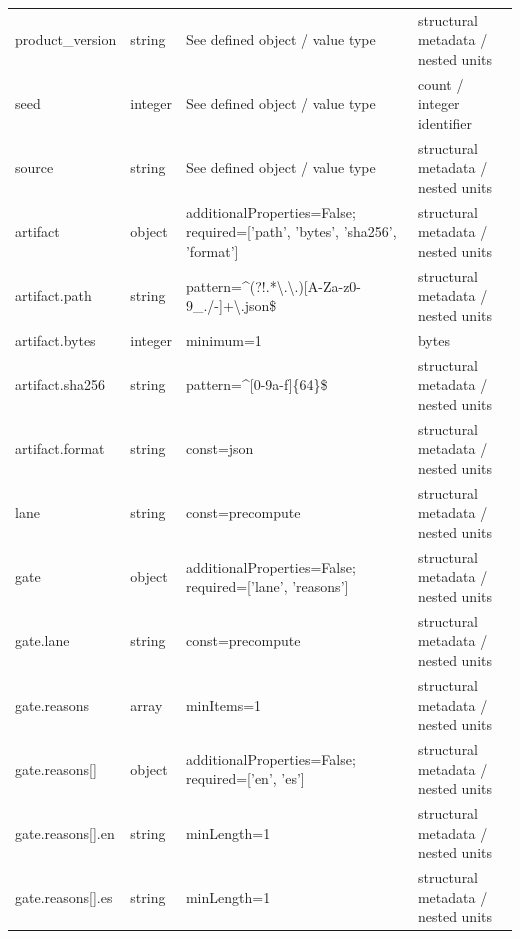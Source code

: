 \begin{longtable}{@{}>{\raggedright\arraybackslash}p{}>{\raggedright\arraybackslash}p{}>{\raggedright\arraybackslash}p{}>{\raggedright\arraybackslash}p{}@{}}
product\_\allowbreak{}version & string & See defined object /\allowbreak{} value type & structural metadata /\allowbreak{} nested units\\
seed & integer & See defined object /\allowbreak{} value type & count /\allowbreak{} integer identifier\\
source & string & See defined object /\allowbreak{} value type & structural metadata /\allowbreak{} nested units\\
artifact & object & additionalProperties=\allowbreak{}False; required=\allowbreak{}['path', 'bytes', 'sha256', 'format'] & structural metadata /\allowbreak{} nested units\\
artifact.\allowbreak{}path & string & pattern=\allowbreak{}\textasciicircum{}(?!.\allowbreak{}*\textbackslash{}.\allowbreak{}\textbackslash{}.\allowbreak{})[A-\allowbreak{}Za-\allowbreak{}z0-9\_\allowbreak{}.\allowbreak{}/\allowbreak{}-]+\textbackslash{}.\allowbreak{}json\$ & structural metadata /\allowbreak{} nested units\\
artifact.\allowbreak{}bytes & integer & minimum=\allowbreak{}1 & bytes\\
artifact.\allowbreak{}sha256 & string & pattern=\allowbreak{}\textasciicircum{}[0-9a-\allowbreak{}f]\{64\}\$ & structural metadata /\allowbreak{} nested units\\
artifact.\allowbreak{}format & string & const=\allowbreak{}json & structural metadata /\allowbreak{} nested units\\
lane & string & const=\allowbreak{}precompute & structural metadata /\allowbreak{} nested units\\
gate & object & additionalProperties=\allowbreak{}False; required=\allowbreak{}['lane', 'reasons'] & structural metadata /\allowbreak{} nested units\\
gate.\allowbreak{}lane & string & const=\allowbreak{}precompute & structural metadata /\allowbreak{} nested units\\
gate.\allowbreak{}reasons & array & minItems=\allowbreak{}1 & structural metadata /\allowbreak{} nested units\\
gate.\allowbreak{}reasons[] & object & additionalProperties=\allowbreak{}False; required=\allowbreak{}['en', 'es'] & structural metadata /\allowbreak{} nested units\\
gate.\allowbreak{}reasons[].\allowbreak{}en & string & minLength=\allowbreak{}1 & structural metadata /\allowbreak{} nested units\\
gate.\allowbreak{}reasons[].\allowbreak{}es & string & minLength=\allowbreak{}1 & structural metadata /\allowbreak{} nested units\\
\end{longtable}\endgroup

